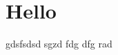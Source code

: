\documentclass[../journal2.tex]{subfiles}
\begin{document}
\section{Hello}

gdsfsdsd 
sgzd fdg dfg rad
\end{document}
